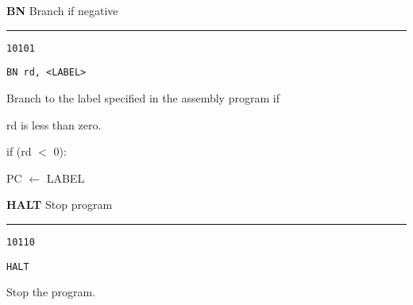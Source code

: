 \documentclass{article}
\begin{document}
\pagebreak

\flushleft
\LARGE\textbf{BN} \large \hfill Branch if negative

\kern-3pt
\noindent\rule{16.5cm}{0.4pt}
\normalsize

{\large
	 \texttt{10101} \par
	\smallbreak
	 \texttt{BN rd, <LABEL>} \par
	\smallbreak
	 Branch to the label specified in the assembly program if  \par
	\makebox[3.5cm][l]{  } rd is less than zero. \par
	\smallbreak
	 if (rd $<$ 0): \par
	\makebox[4cm][l]{  } PC $\leftarrow$ LABEL \par
}

\flushleft
\LARGE\textbf{HALT} \large \hfill Stop program

\kern-3pt
\noindent\rule{16.5cm}{0.4pt}
\normalsize

{\large
	 \texttt{10110} \par
	\smallbreak
	 \texttt{HALT} \par
	\smallbreak
	 Stop the program. \par
}
\end{document}
